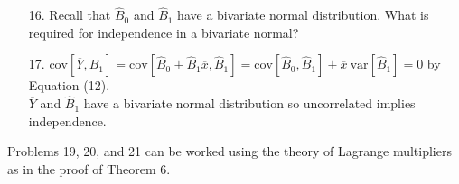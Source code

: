 \begin{enumerate}
	\newpage

	\item[16.] Recall that $\hat{B}_0$ and $\hat{B}_1$ have a bivariate normal distribution. What is required for independence in a bivariate normal?
	
	\item[17.] $\mbox{cov}[\overline{Y},\hat{B}_1] = \mbox{cov}[\hat{B}_0+\hat{B}_1\overline{x}, \hat{B}_1] = \mbox{cov}[\hat{B}_0, \hat{B}_1] + \overline{x}\ \mbox{var}[\hat{B}_1] = 0$ by Equation (12). \\
	$\overline{Y}$ and $\hat{B}_1$ have a bivariate normal distribution so uncorrelated implies independence. 
	
\end{enumerate}

\noindent Problems 19, 20, and 21 can be worked using the theory of Lagrange multipliers as in the proof of Theorem 6.
